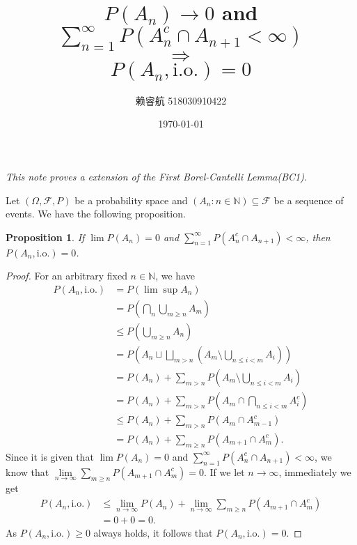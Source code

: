 \documentclass[a4paper, linespread=1.5]{article}
\newtheorem{proposition}[theorem]{Proposition}
\newcommand{\Natural}{\mathbb{N}}
\begin{document}
    \title{$P(A_n) \rightarrow 0$ and $\sum_{n = 1}^{\infty} P(A_n^c \cap A_{n + 1} < \infty)$ \\ $\Rightarrow$ \\ $P(A_n, \textrm{i.o.}) = 0$}
    \author{赖睿航 518030910422}
    \date{\today}
    \maketitle
    
    \textit{This note proves a extension of the First Borel-Cantelli Lemma(BC1).}

    \medskip
    
    Let $(\Omega, \mathcal{F}, P)$ be a probability space and $(A_n \colon n \in \Natural) \subseteq \mathcal{F}$ be a sequence of events. We have the following proposition.
    \begin{proposition}
        If $\lim P(A_n) = 0$ and $\sum\limits_{n = 1}^{\infty} P(A_n^c \cap A_{n + 1}) < \infty$, then $P(A_n, \textrm{i.o.}) = 0$. \cite{Chandra2012}
    \end{proposition}

    \begin{proof}
        For an arbitrary fixed $n \in \Natural$, we have
        \begin{align*}
            P(A_n, \textrm{i.o.}) &= P(\lim \sup A_n) \\
            &= P(\bigcap_n \bigcup_{m \geqslant n} A_m) \\
            &\leqslant P(\bigcup_{m \geqslant n} A_n) \\
            &= P(A_n \sqcup \bigsqcup_{m > n}(A_m \setminus \bigcup_{n \leqslant i < m}A_i)) \\
            &= P(A_n) + \sum_{m > n} P(A_m \setminus \bigcup_{n \leqslant i < m}A_i) \\
            &= P(A_n) + \sum_{m > n} P(A_m \cap \bigcap_{n \leqslant i < m} A_i^c) \\
            &\leqslant P(A_n) + \sum_{m > n} P(A_m \cap A_{m - 1}^c) \\
            &= P(A_n) + \sum_{m \geqslant n} P(A_{m + 1} \cap A_m^c).
        \end{align*}
        Since it is given that $\lim P(A_n) = 0$ and $\sum\limits_{n = 1}^{\infty} P(A_n^c \cap A_{n + 1}) < \infty$, we know that $\lim\limits_{n \rightarrow \infty} \sum\limits_{m \geqslant n} P(A_{m + 1} \cap A_m^c) = 0$. If we let $n \rightarrow \infty$, immediately we get
        \begin{align*}
            P(A_n, \textrm{i.o.}) &\leqslant \lim_{n \rightarrow \infty} P(A_n) + \lim_{n \rightarrow \infty} \sum_{m \geqslant n} P(A_{m + 1} \cap A_m^c) \\
            &= 0 + 0 = 0.
        \end{align*}
        As $P(A_n, \textrm{i.o.}) \geqslant 0$ always holds, it follows that $P(A_n, \textrm{i.o.}) = 0$.
    \end{proof}

    
    
\end{document}
